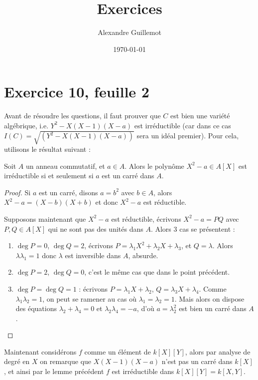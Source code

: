 \documentclass[11pt]{article}
\begin{document}
\title{Exercices}
\date{\today}
\author{Alexandre Guillemot}
\maketitle

\section*{Exercice 10, feuille 2}
Avant de résoudre les questions, il faut prouver que $C$ est bien une variété algébrique, i.e. $Y^2 - X(X-1)(X-a)$ est irréductible (car dans ce cas $I(C) = \sqrt{(Y^2 - X(X-1)(X-a))}$ sera un idéal premier). Pour cela, utilisons le résultat suivant :
\begin{lemm}
    Soit $A$ un anneau commutatif, et $a \in A$. Alors le polynôme $X^2 - a \in A[X]$ est irréductible si et seulement si $a$ est un carré dans $A$.
\end{lemm}
\begin{proof}
    \item Si $a$ est un carré, disons $a = b^2$ avec $b \in A$, alors $X^2 - a = (X - b)(X + b)$ et donc $X^2 - a$ est réductible.
    \item Supposons maintenant que $X^2 - a$ est réductible, écrivons $X^2 - a = PQ$ avec $P,Q \in A[X]$ qui ne sont pas des unités dans $A$. Alors 3 cas se présentent :
    \begin{enumerate}
        \item $\deg P = 0$, $\deg Q = 2$, écrivons $P = \lambda_1X^2 + \lambda_2X + \lambda_3$, et $Q = \lambda$. Alors $\lambda \lambda_1 = 1$ donc $\lambda$ est inversible dans $A$, absurde.
        \item $\deg P = 2$, $\deg Q = 0$, c'est le même cas que dans le point précédent.
        \item $\deg P = \deg Q = 1$ : écrivons $P = \lambda_1X + \lambda_2$, $Q = \lambda_3X + \lambda_4$. Comme $\lambda_1\lambda_2 = 1$, on peut se ramener au cas où $\lambda_1 = \lambda_2 = 1$. Mais alors on dispose des équations $\lambda_2 + \lambda_4 = 0$ et $\lambda_2 \lambda_4 = -a$, d'où $a = \lambda_2^2$ est bien un carré dans $A$.
    \end{enumerate}
\end{proof}
Maintenant considérons $f$ comme un élément de $k[X][Y]$, alors par analyse de degré en $X$ on remarque que $X(X-1)(X-a)$ n'est pas un carré dans $k[X]$, et ainsi par le lemme précédent $f$ est irréductible dans $k[X][Y] = k[X,Y]$.
\end{document}
